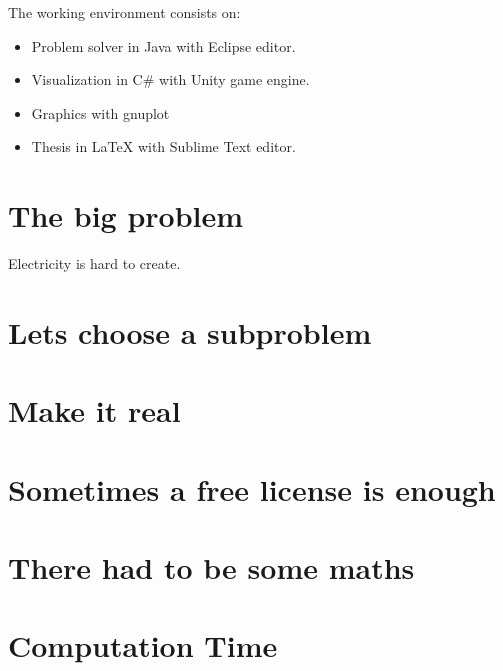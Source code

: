 \documentclass[a4paper]{article}
\begin{document}
The working environment consists on:

\begin{itemize}
	
	\item Problem solver in Java with Eclipse editor.
	\item Visualization in C\# with Unity game engine.
	\item Graphics with gnuplot
	\item Thesis in LaTeX with Sublime Text editor.

\end{itemize} 

\section{ The big problem }

Electricity is hard to create.

\section{ Lets choose a subproblem }

\section{ Make it real }

\section{ Sometimes a free license is enough }

\section{ There had to be some maths }

\section{ Computation Time }
\end{document}
